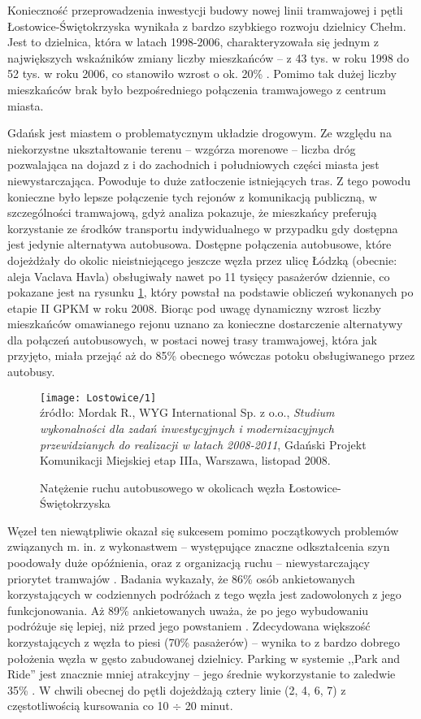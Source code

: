 \documentclass[twoside,12pt]{article}
\begin{document}
	Konieczność przeprowadzenia inwestycji budowy nowej linii tramwajowej i pętli Łostowice-Świętokrzyska wynikała z bardzo szybkiego rozwoju dzielnicy Chełm. Jest to dzielnica, która w latach 1998-2006, charakteryzowała się jednym z największych wskaźników zmiany liczby mieszkańców -- z 43 tys. w roku 1998 do 52 tys. w roku 2006, co stanowiło wzrost o ok. 20\% \cite{opracowanie_gdansk}. Pomimo tak dużej liczby mieszkańców brak było bezpośredniego połączenia tramwajowego z centrum miasta.
	
	Gdańsk jest miastem o problematycznym układzie drogowym. Ze względu na niekorzystne ukształtowanie terenu -- wzgórza morenowe -- liczba dróg pozwalająca na dojazd z i do zachodnich i południowych części miasta jest niewystarczająca. Powoduje to duże zatłoczenie istniejących tras. Z tego powodu konieczne było lepsze połączenie tych rejonów z komunikacją publiczną, w szczególności tramwajową, gdyż analiza pokazuje, że mieszkańcy preferują korzystanie ze środków transportu indywidualnego w przypadku gdy dostępna jest jedynie alternatywa autobusowa. Dostępne połączenia autobusowe, które dojeżdżały do okolic nieistniejącego jeszcze węzła przez ulicę Łódzką (obecnie: aleja Vaclava Havla) obsługiwały nawet po 11 tysięcy pasażerów dziennie, co pokazane jest na rysunku \ref{lostowice2}, który powstał na podstawie obliczeń wykonanych po etapie II GPKM w roku 2008. Biorąc pod uwagę dynamiczny wzrost liczby mieszkańców omawianego rejonu uznano za konieczne dostarczenie alternatywy dla połączeń autobusowych, w postaci nowej trasy tramwajowej, która jak przyjęto, miała przejąć aż do 85\% obecnego wówczas potoku obsługiwanego przez autobusy.
	
	\begin{figure}[H]
		\centering
		\caption{Natężenie ruchu autobusowego w okolicach węzła Łostowice-Świętokrzyska}
		\texttt{[image: Lostowice/1]}\\
		\footnotesize{źródło: Mordak R., WYG International Sp. z o.o., \emph{Studium wykonalności dla zadań inwestycyjnych i 
		modernizacyjnych przewidzianych do realizacji w latach 2008-2011}, Gdański Projekt Komunikacji Miejskiej etap IIIa, 
		Warszawa, listopad 2008. \cite{opracowanie_gdansk}}
		\label{lostowice2}
	\end{figure}
	
	Węzeł ten niewątpliwie okazał się sukcesem pomimo początkowych problemów związanych m. in. z wykonastwem -- występujące znaczne odkształcenia szyn poodowały duże opóźnienia, oraz z organizacją ruchu -- niewystarczający priorytet tramwajów \cite{kaszubowski}. Badania wykazały, że 86\% osób ankietowanych korzystających w codziennych podróżach z tego węzła jest zadowolonych z jego funkcjonowania. Aż 89\% ankietowanych uważa, że po jego wybudowaniu podróżuje się lepiej, niż przed jego powstaniem \cite{maciej_lada}. Zdecydowana większość korzystających z węzła to piesi (70\% pasażerów) -- wynika to z bardzo dobrego położenia węzła w gęsto zabudowanej dzielnicy. Parking w systemie ,,Park and Ride'' jest znacznie mniej atrakcyjny -- jego średnie wykorzystanie to zaledwie 35\% \cite{kaszubowski}. W chwili obecnej do pętli dojeżdżają cztery linie (2, 4, 6, 7) z częstotliwością kursowania co 10 $\div$ 20 minut. 
	
\end{document}
